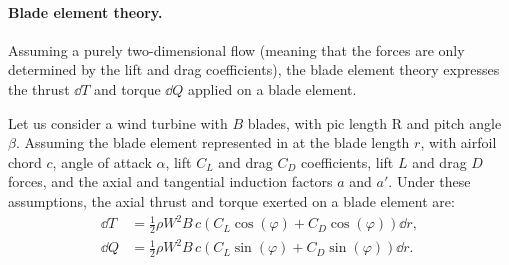 \paragraph{Blade element theory.}
Assuming a purely two-dimensional flow (meaning that the forces are only determined by the lift and drag coefficients), the blade element theory expresses the thrust $\dd T$ and torque $\dd Q$ applied on a blade element.

Let us consider a wind turbine with $B$ blades, with pic length R and pitch angle $\beta$. 
Assuming the blade element represented in  at the blade length $r$, with airfoil chord $c$, angle of attack $\alpha$,  lift $C_L$ and drag $C_D$ coefficients, lift $L$ and drag $D$ forces, and the axial and tangential induction factors $a$ and $a'$. 
Under these assumptions, the axial thrust and torque exerted on a blade element are:
\begin{subequations}
    \begin{align}
        \dd T &= \frac12 \rho W^2 B\, c \left(C_L \cos(\varphi) + C_D \cos(\varphi)\right) \dd r,\\
        \dd Q &= \frac12 \rho W^2 B\, c \left(C_L \sin(\varphi) + C_D \sin(\varphi)\right) \dd r.
    \end{align}
    \label{eq:blade_element}    
\end{subequations}

